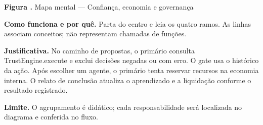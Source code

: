 {\small\textbf{Figura \thefigure.} Mapa mental --- Confiança, economia e governança}\par\smallskip
\noindent\textbf{Como funciona e por quê.} Parta do centro e leia os quatro ramos. As linhas associam conceitos; não representam chamadas de funções.\par
\noindent\textbf{Justificativa.} No caminho de propostas, o primário consulta TrustEngine.execute e exclui decisões negadas ou com erro. O gate usa o histórico da ação. Após escolher um agente, o primário tenta reservar recursos na economia interna. O relato de conclusão atualiza o aprendizado e a liquidação conforme o resultado registrado.\par
\noindent\textbf{Limite.} O agrupamento é didático; cada responsabilidade será localizada no diagrama e conferida no fluxo.\par\smallskip
{}
